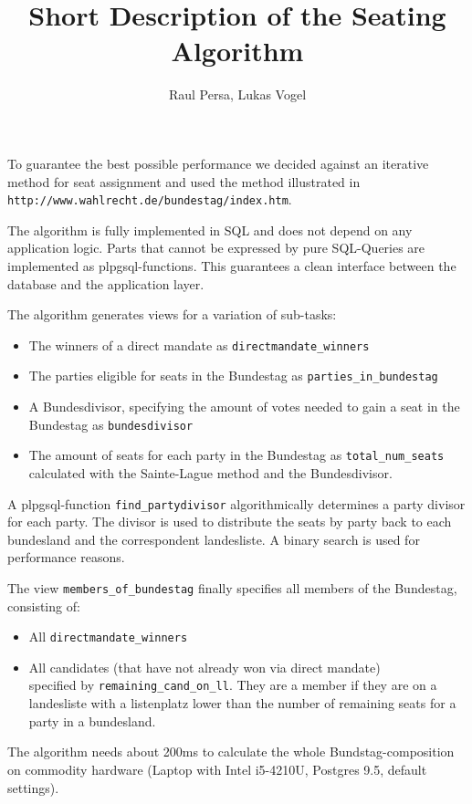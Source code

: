 \documentclass[10pt,a4paper]{article}
\author{Raul Persa, Lukas Vogel}
\title{Short Description of the Seating Algorithm}
\begin{document}
\maketitle

To guarantee the best possible performance we decided against an iterative method for seat assignment and used the method illustrated in \\ \texttt{http://www.wahlrecht.de/bundestag/index.htm}.

The algorithm is fully implemented in SQL and does not depend on any application logic. Parts that cannot be expressed by pure SQL-Queries are implemented as plpgsql-functions. This guarantees a clean interface between the database and the application layer.

The algorithm generates views for a variation of sub-tasks:
\begin{itemize}
		\item The winners of a direct mandate as \verb|directmandate_winners|
		\item The parties eligible for seats in the Bundestag as \verb|parties_in_bundestag|
		\item A Bundesdivisor, specifying the amount of votes needed to gain a seat in the Bundestag as \verb|bundesdivisor|
		\item The amount of seats for each party in the Bundestag as \verb|total_num_seats| calculated with the Sainte-Lague method and the Bundesdivisor.
\end{itemize}

A plpgsql-function \verb|find_partydivisor| algorithmically determines a party divisor for each party. The divisor is used to distribute the seats by party back to each bundesland and the correspondent landesliste. A binary search is used for performance reasons.

The view \verb|members_of_bundestag| finally specifies all members of the Bundestag, consisting of:

\begin{itemize}
	\item All \verb|directmandate_winners|
	\item All candidates (that have not already won via direct mandate) \\
	 specified by \verb|remaining_cand_on_ll|.
	 They are a member if they are on a landesliste with a listenplatz lower than the number of remaining seats for a party in a bundesland.
\end{itemize}


The algorithm needs about 200ms to calculate the whole Bundstag-composition on commodity hardware (Laptop with Intel i5-4210U, Postgres 9.5, default settings).
\end{document}
